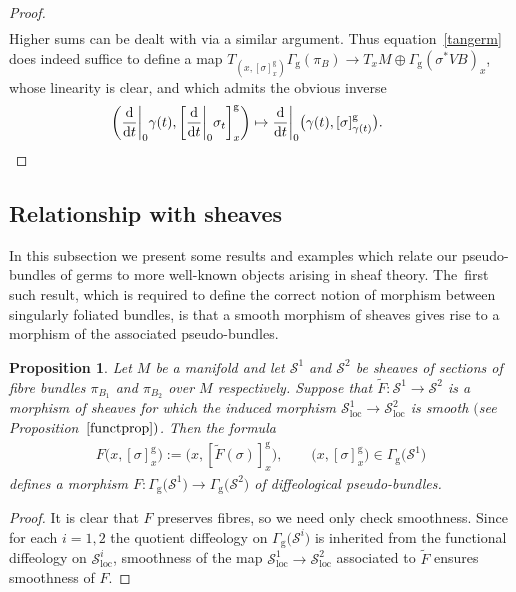 \documentclass[10pt,a4paper]{amsart}
\numberwithin{equation}{section}
\newtheorem{Proposition}[Theorem]{Proposition}
\def\loc{\operatorname{loc}}
\def\g{\operatorname{g}}
\def\SS{{\mathscr{S}}}
\begin{document}
\begin{proof}
\begin{gather*}
\end{gather*}
Higher sums can be dealt with via a similar argument. Thus equation~\eqref{tangerm} does indeed suffice to define a map $T_{\left(x,[\sigma]^{\g}_{x}\right)}\Gamma_{\g}(\pi_{B})\rightarrow T_{x}M\oplus\Gamma_{\g}(\sigma^{*}VB)_{x}$, whose linearity is clear, and which admits the obvious inverse
\begin{gather*}
\bigg(\frac{\rm d}{{\rm d}t}\bigg|_{0}\gamma(t),\bigg[\frac{\rm d}{{\rm d}t}\bigg|_{0}\sigma_{t}\bigg]^{\g}_{x}\bigg)\mapsto \frac{\rm d}{{\rm d}t}\bigg|_{0}\big(\gamma(t),[\sigma]^{\g}_{\gamma(t)}\big).\tag*{\qed}
\end{gather*}
\renewcommand{\qed}{}
\end{proof}

\subsection{Relationship with sheaves}\label{relsheaf}

In this subsection we present some results and examples which relate our pseudo-bundles of germs to more well-known objects arising in sheaf theory. The~first such result, which is required to define the correct notion of morphism between singularly foliated bundles, is that a smooth morphism of sheaves gives rise to a morphism of the associated pseudo-bundles.

\begin{Proposition}\label{relsheaf1}
Let $M$ be a manifold and let $\SS^{1}$ and $\SS^{2}$ be sheaves of sections of fibre bundles $\pi_{B_{1}}$ and $\pi_{B_{2}}$ over $M$ respectively. Suppose that $\tilde{F}\colon \SS^{1}\rightarrow\SS^{2}$ is a morphism of sheaves for which the induced morphism $\SS^{1}_{\loc}\rightarrow\SS^{2}_{\loc}$ is smooth $($see Proposition~$\ref{functprop})$. Then the formula
\begin{gather*}
F\big(x,[\sigma]^{\g}_{x}\big):=\big(x,[\tilde{F}(\sigma)]^{\g}_{x}\big),\qquad \big(x,[\sigma]^{\g}_{x}\big)\in\Gamma_{\g}\big(\SS^{1}\big)
\end{gather*}
defines a morphism $F\colon \Gamma_{\g}\big(\SS^{1}\big)\rightarrow\Gamma_{\g}\big(\SS^{2}\big)$ of diffeological pseudo-bundles.
\end{Proposition}

\begin{proof}
It is clear that $F$ preserves fibres, so we need only check smoothness. Since for each $i=1,2$ the quotient diffeology on $\Gamma_{\g}\big(\SS^{i}\big)$ is inherited from the functional diffeology on $\SS^{i}_{\loc}$, smoothness of the map $\SS^{1}_{\loc}\rightarrow\SS^{2}_{\loc}$ associated to $\tilde{F}$ ensures smoothness of $F$.
\end{proof}
\end{document}
